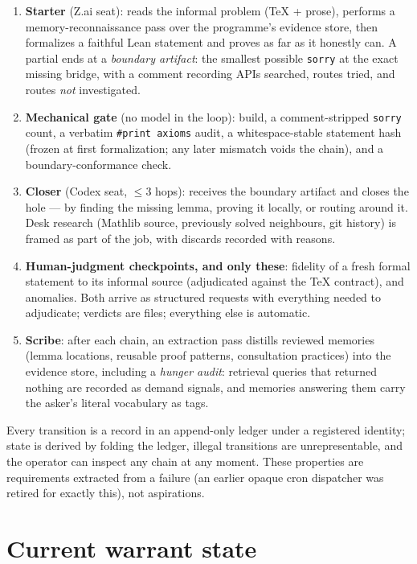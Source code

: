 \documentclass[11pt]{article}
\begin{document}
\begin{enumerate}
\item \textbf{Starter} (Z.ai seat): reads the informal problem (TeX +
prose), performs a memory-reconnaissance pass over the programme's
evidence store, then formalizes a faithful Lean statement and proves
as far as it honestly can. A partial ends at a \emph{boundary
artifact}: the smallest possible \texttt{sorry} at the exact missing
bridge, with a comment recording APIs searched, routes tried, and
routes \emph{not} investigated.
\item \textbf{Mechanical gate} (no model in the loop): build, a
comment-stripped \texttt{sorry} count, a verbatim \texttt{\#print
axioms} audit, a whitespace-stable statement hash (frozen at first
formalization; any later mismatch voids the chain), and a
boundary-conformance check.
\item \textbf{Closer} (Codex seat, $\le 3$ hops): receives the
boundary artifact and closes the hole --- by finding the missing
lemma, proving it locally, or routing around it. Desk research
(Mathlib source, previously solved neighbours, git history) is
framed as part of the job, with discards recorded with reasons.
\item \textbf{Human-judgment checkpoints, and only these}: fidelity
of a fresh formal statement to its informal source (adjudicated
against the TeX contract), and anomalies. Both arrive as structured
requests with everything needed to adjudicate; verdicts are files;
everything else is automatic.
\item \textbf{Scribe}: after each chain, an extraction pass distills
reviewed memories (lemma locations, reusable proof patterns,
consultation practices) into the evidence store, including a
\emph{hunger audit}: retrieval queries that returned nothing are
recorded as demand signals, and memories answering them carry the
asker's literal vocabulary as tags.
\end{enumerate}

Every transition is a record in an append-only ledger under a
registered identity; state is derived by folding the ledger, illegal
transitions are unrepresentable, and the operator can inspect any
chain at any moment. These properties are requirements extracted from
a failure (an earlier opaque cron dispatcher was retired for exactly
this), not aspirations.

\section{Current warrant state}
\end{document}
